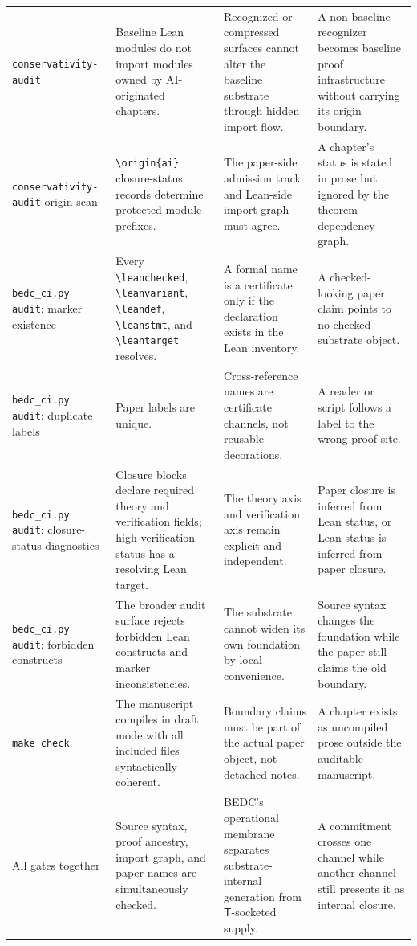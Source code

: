 \begin{longtable}{p{}p{}p{}p{}}
\texttt{conservativity-audit} & Baseline Lean modules do not import modules owned by AI-originated chapters. & Recognized or compressed surfaces cannot alter the baseline substrate through hidden import flow. & A non-baseline recognizer becomes baseline proof infrastructure without carrying its origin boundary. \\
\texttt{conservativity-audit} origin scan & \texttt{\textbackslash origin\{ai\}} closure-status records determine protected module prefixes. & The paper-side admission track and Lean-side import graph must agree. & A chapter's status is stated in prose but ignored by the theorem dependency graph. \\
\texttt{bedc\_ci.py audit}: marker existence & Every \texttt{\textbackslash leanchecked}, \texttt{\textbackslash leanvariant}, \texttt{\textbackslash leandef}, \texttt{\textbackslash leanstmt}, and \texttt{\textbackslash leantarget} resolves. & A formal name is a certificate only if the declaration exists in the Lean inventory. & A checked-looking paper claim points to no checked substrate object. \\
\texttt{bedc\_ci.py audit}: duplicate labels & Paper labels are unique. & Cross-reference names are certificate channels, not reusable decorations. & A reader or script follows a label to the wrong proof site. \\
\texttt{bedc\_ci.py audit}: closure-status diagnostics & Closure blocks declare required theory and verification fields; high verification status has a resolving Lean target. & The theory axis and verification axis remain explicit and independent. & Paper closure is inferred from Lean status, or Lean status is inferred from paper closure. \\
\texttt{bedc\_ci.py audit}: forbidden constructs & The broader audit surface rejects forbidden Lean constructs and marker inconsistencies. & The substrate cannot widen its own foundation by local convenience. & Source syntax changes the foundation while the paper still claims the old boundary. \\
\texttt{make check} & The manuscript compiles in draft mode with all included files syntactically coherent. & Boundary claims must be part of the actual paper object, not detached notes. & A chapter exists as uncompiled prose outside the auditable manuscript. \\
All gates together & Source syntax, proof ancestry, import graph, and paper names are simultaneously checked. & BEDC's operational membrane separates substrate-internal generation from $\mathsf{T}$-socketed supply. & A commitment crosses one channel while another channel still presents it as internal closure. \\
\bottomrule
\end{longtable}


